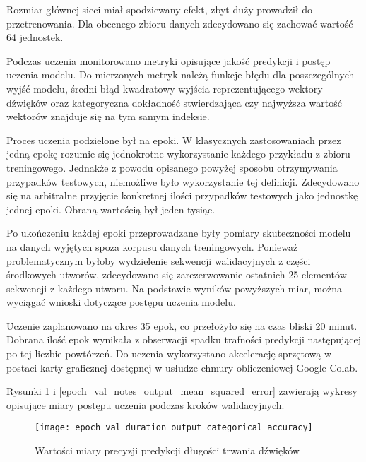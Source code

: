 {{        Rozmiar głównej sieci miał spodziewany efekt, zbyt duży prowadził do przetrenowania. Dla obecnego
        zbioru danych zdecydowano się zachować wartość 64 jednostek.

        \bigskip

        Podczas uczenia monitorowano metryki opisujące jakość predykcji i\,\,postęp uczenia modelu.
        Do mierzonych metryk należą funkcje błędu dla poszczególnych wyjść modelu, średni błąd kwadratowy
        wyjścia reprezentującego wektory dźwięków oraz kategoryczna dokładność stwierdzająca czy najwyższa wartość
        wektorów znajduje się na tym samym indeksie.
        
        Proces uczenia podzielone był na epoki. W\,\,klasycznych zastosowaniach przez jedną epokę rozumie się jednokrotne
        wykorzystanie każdego przykładu z\,\,zbioru treningowego. Jednakże z\,\,powodu opisanego powyżej sposobu otrzymywania
        przypadków testowych, niemożliwe było wykorzystanie tej definicji. Zdecydowano się na arbitralne przyjęcie konkretnej 
        ilości przypadków testowych jako jednostkę jednej epoki. Obraną wartością był jeden tysiąc.

        Po ukończeniu każdej epoki przeprowadzane były pomiary skuteczności modelu na danych wyjętych spoza korpusu 
        danych treningowych. Ponieważ problematycznym byłoby wydzielenie sekwencji walidacyjnych z\,\,części środkowych
        utworów, zdecydowano się zarezerwowanie ostatnich 25 elementów sekwencji z\,\,każdego utworu.
        Na podstawie wyników powyższych miar, można wyciągać wnioski dotyczące postępu uczenia modelu.

        Uczenie zaplanowano na okres 35 epok, co przełożyło się na czas bliski 20 minut. Dobrana ilość epok wynikała 
        z\,\,obserwacji spadku trafności predykcji następującej po tej liczbie powtórzeń. Do uczenia wykorzystano
        akcelerację sprzętową w\,\,postaci karty graficznej dostępnej w\,\,usłudze chmury obliczeniowej Google Colab.

        Rysunki \ref{epoch_val_duration_output_categorical_accuracy} i\,\,\ref{epoch_val_notes_output_mean_squared_error} zawierają wykresy opisujące miary postępu uczenia podczas kroków walidacyjnych.

        \begin{figure}[H]
            \centering
            \texttt{[image: epoch\_val\_duration\_output\_categorical\_accuracy]}
            \caption{Wartości miary precyzji predykcji długości trwania dźwięków}
            \label{epoch_val_duration_output_categorical_accuracy}
        \end{figure}

}}
